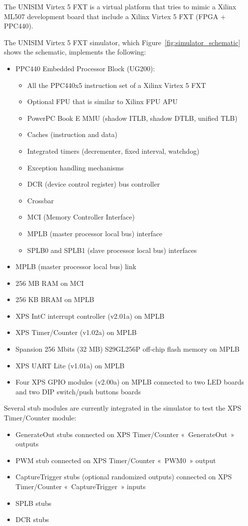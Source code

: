 The UNISIM Virtex 5 FXT is a virtual platform that tries to mimic a Xilinx ML507 development board that include a Xilinx Virtex 5 FXT (FPGA + PPC440).

\noindent The UNISIM Virtex 5 FXT simulator, which Figure~\ref{fig:simulator_schematic} shows the schematic, implements the following:
\begin{itemize}
	\item PPC440 Embedded Processor Block (UG200):
		\begin{itemize}
			\item All the PPC440x5 \cite{PPC440x5} instruction set of a Xilinx Virtex 5 FXT
			\item Optional FPU that is similar to Xilinx FPU APU \cite{APU_FPU}
			\item PowerPC Book E MMU (shadow ITLB, shadow DTLB, unified TLB)
			\item Caches (instruction and data)
			\item Integrated timers (decrementer, fixed interval, watchdog)
			\item Exception handling mechanisms
			\item DCR (device control register) bus controller
			\item Crossbar
			\item MCI (Memory Controller Interface)
			\item MPLB (master processor local bus) interface
			\item SPLB0 and SPLB1 (slave processor local bus) interfaces
		\end{itemize}
	\item MPLB (master processor local bus) link
	\item 256 MB RAM on MCI
	\item 256 KB BRAM on MPLB
	\item XPS IntC interrupt controller (v2.01a) \cite{XPS_INTC} on MPLB
	\item XPS Timer/Counter (v1.02a) \cite{XPS_TIMER_COUNTER} on MPLB
	\item Spansion 256 Mbits (32 MB) S29GL256P off-chip flash memory \cite{S29GLP} on MPLB
	\item XPS UART Lite (v1.01a) \cite{XPS_UART_LITE} on MPLB
	\item Four XPS GPIO modules (v2.00a) \cite{XPS_GPIO} on MPLB connected to two LED boards and two DIP switch/push buttons boards
\end{itemize}

\noindent Several stub modules are currently integrated in the simulator to test the XPS Timer/Counter module:
\begin{itemize}
\item GenerateOut stubs connected on XPS Timer/Counter « GenerateOut » outputs
\item PWM stub connected on XPS Timer/Counter « PWM0 » output
\item CaptureTrigger stubs (optional randomized outputs) connected on XPS Timer/Counter « CaptureTrigger » inputs
\item SPLB stubs
\item DCR stubs
\end{itemize}

